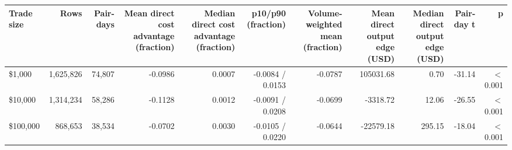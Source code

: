 \begin{tabular}{lrrrrrrrrrr}
\toprule
Trade size & Rows & Pair-days & Mean direct cost advantage (fraction) & Median direct cost advantage (fraction) & p10/p90 (fraction) & Volume-weighted mean (fraction) & Mean direct output edge (USD) & Median direct output edge (USD) & Pair-day t & p \\
\midrule
\$1,000 & 1,625,826 & 74,807 & -0.0986 & 0.0007 & -0.0084 / 0.0153 & -0.0787 & 105031.68 & 0.70 & -31.14 & \ensuremath{<}0.001 \\
\$10,000 & 1,314,234 & 58,286 & -0.1128 & 0.0012 & -0.0091 / 0.0208 & -0.0699 & -3318.72 & 12.06 & -26.55 & \ensuremath{<}0.001 \\
\$100,000 & 868,653 & 38,534 & -0.0702 & 0.0030 & -0.0105 / 0.0220 & -0.0644 & -22579.18 & 295.15 & -18.04 & \ensuremath{<}0.001 \\
\bottomrule
\end{tabular}
